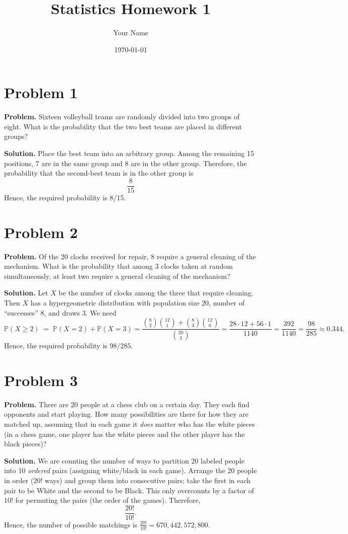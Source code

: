 \documentclass{article}
\title{Statistics Homework 1}
\author{Your Name}
\date{\today}
\begin{document}
\maketitle

\section{Problem 1}

\textbf{Problem.} Sixteen volleyball teams are randomly divided into two groups of eight. What is the probability that the two best teams are placed in different groups?

\textbf{Solution.} Place the best team into an arbitrary group. Among the remaining 15 positions, 7 are in the same group and 8 are in the other group. Therefore, the probability that the second-best team is in the other group is
\[
\frac{8}{15}
\]
Hence, the required probability is 8/15.
\section{Problem 2}

\textbf{Problem.} Of the 20 clocks received for repair, 8 require a general cleaning of the mechanism. What is the probability that among 3 clocks taken at random simultaneously, at least two require a general cleaning of the mechanism?

\textbf{Solution.} Let $X$ be the number of clocks among the three that require cleaning. Then $X$ has a hypergeometric distribution with population size $20$, number of ``successes'' $8$, and draws $3$. We need
\[
\mathbb{P}(X \ge 2) \;=\; \mathbb{P}(X=2) + \mathbb{P}(X=3)
= \frac{\binom{8}{2}\binom{12}{1} + \binom{8}{3}\binom{12}{0}}{\binom{20}{3}}
= \frac{28\cdot 12 + 56\cdot 1}{1140}
= \frac{392}{1140}
= \frac{98}{285}
\approx 0.344.
\]
Hence, the required probability is $98/285$.
\section{Problem 3}

\textbf{Problem.} There are 20 people at a chess club on a certain day. They each find opponents and start playing. How many possibilities are there for how they are matched up, assuming that in each game it \emph{does} matter who has the white pieces (in a chess game, one player has the white pieces and the other player has the black pieces)?

\textbf{Solution.} We are counting the number of ways to partition 20 labeled people into 10 \emph{ordered} pairs (assigning white/black in each game). Arrange the 20 people in order ($20!$ ways) and group them into consecutive pairs; take the first in each pair to be White and the second to be Black. This only overcounts by a factor of $10!$ for permuting the pairs (the order of the games). Therefore,
\[
\frac{20!}{10!}.
\]
Hence, the number of possible matchings is $\displaystyle \frac{20!}{10!}=670{,}442{,}572{,}800$.
\end{document}
